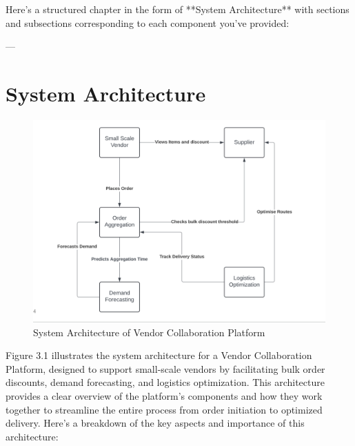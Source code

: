 Here's a structured chapter in the form of **System Architecture** with sections and subsections corresponding to each component you've provided:

---

\chapter{System Architecture}


\begin{figure}[h]
    \centering
    \includegraphics[width=\textwidth]{Figures/system architecture.png}
    \caption{System Architecture of Vendor Collaboration Platform}
    \label{fig:architecture}
\end{figure}

\noindent Figure 3.1 illustrates the system architecture for a Vendor Collaboration Platform, designed to support small-scale vendors by facilitating bulk order discounts, demand forecasting, and logistics optimization. This architecture provides a clear overview of the platform’s components and how they work together to streamline the entire process from order initiation to optimized delivery. Here’s a breakdown of the key aspects and importance of this architecture:


